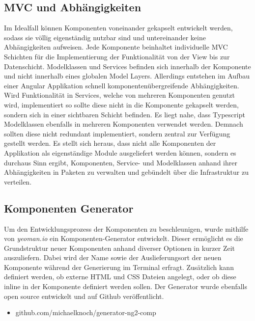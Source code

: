 \subsection{MVC und Abhängigkeiten}

Im Idealfall können Komponenten voneinander gekapselt entwickelt werden,
sodass sie völlig eigenständig nutzbar sind und untereinander keine Abhängigkeiten aufweisen.
Jede Komponente beinhaltet individuelle \ac{MVC} Schichten für die Implementierung der Funktionalität von der View bis zur Datenschicht.
Modelklassen und Services befinden sich innerhalb der Komponente und nicht innerhalb eines globalen Model Layers.
Allerdings entstehen im Aufbau einer Angular Applikation schnell komponentenübergreifende Abhängigkeiten.
Wird Funktionalität in Services, welche von mehreren Komponenten genutzt wird, implementiert
so sollte diese nicht in die Komponente gekapselt werden, sondern sich in einer sichtbaren Schicht befinden.
Es liegt nahe, dass Typescript Modelklassen ebenfalls in mehreren Komponenten verwendet werden.
Demnach sollten diese nicht redundant implementiert,
sondern zentral zur Verfügung gestellt werden. Es stellt sich heraus,
dass nicht alle Komponenten der Applikation \projectname{} als eigenständige Module ausgeliefert werden können,
sondern es durchaus Sinn ergibt, Komponenten, Service- und Modelklassen anhand ihrer Abhängigkeiten in Paketen zu verwalten und
gebündelt über die Infrastruktur zu verteilen.


\subsection{Komponenten Generator}

Um den Entwicklungsprozess der Komponenten zu beschleunigen, wurde mithilfe von \emph{yeoman.io} ein Komponenten-Generator entwickelt.
Dieser ermöglicht es die Grundstruktur neuer Komponenten anhand diverser Optionen in kurzer Zeit auszuliefern.
Dabei wird der Name sowie der Auslieferungsort der neuen Komponente während der Generierung im Terminal erfragt.
Zusätzlich kann definiert werden, ob externe \ac{HTML} und \ac{CSS} Dateien angelegt, oder ob diese inline in der Komponente definiert werden sollen.
Der Generator wurde ebenfalls open source entwickelt und auf Github veröffentlicht.

\begin{itemize}
\item github.com/michaelknoch/generator-ng2-comp
\end{itemize}


